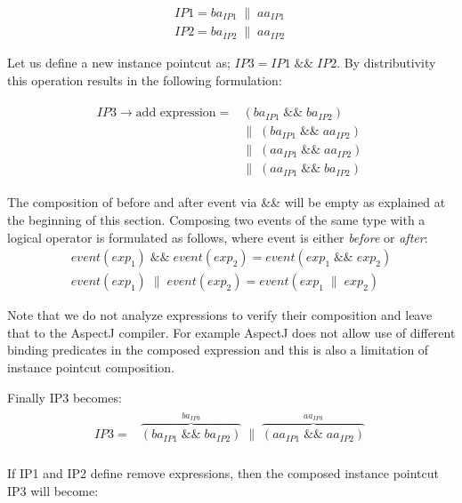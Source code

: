 \documentclass{llncs}
\begin{document}
\begin{align}
	IP1 = ba_{IP1}\;\|\;aa_{IP1}\;%
\label{i1}	\\
	IP2 = ba_{IP2}\;\|\;aa_{IP2}\;%
\label{i2}
\end{align}

Let us define a new instance pointcut as; $IP3 = IP1\;\textrm{\&\&}\;IP2$. By distributivity this operation results in the following formulation:

\begin{align}
\begin{split}
IP3 \rightarrow \textrm{add expression} =& \left( ba_{IP1}\;\textrm{\&\&}\;ba_{IP2}\right)\;\\ 
							&\|\;\left( ba_{IP1}\;\textrm{\&\&}\;aa_{IP2} \right)\;\\
&\|\;\left( aa_{IP1}\;\textrm{\&\&}\;aa_{IP2} \right)\;\\
&\|\;\left( aa_{IP1}\;\textrm{\&\&}\;ba_{IP2} \right) 
\label{i3add}
\end{split}
\end{align}

The composition of before and after event via \&\& will be empty as explained at the beginning of this section. Composing two events of the same type with a logical operator is formulated as follows, where event is either \emph{before} or \emph{after}:
\begin{align*}
event(exp_1)\;\&\&\;event(exp_2) = event(exp_1\;\&\&\;exp_2) \\
event(exp_1)\;\|\;event(exp_2) = event(exp_1\;\|\;exp_2)
\end{align*}

Note that we do not analyze expressions to verify their composition and leave that to the AspectJ compiler. For example AspectJ does not allow use of different binding predicates in the composed expression and this is also a limitation of instance pointcut composition. 

Finally IP3 becomes:
\begin{align}
\begin{split}
IP3 =& \overbrace{\left( ba_{IP1}\;\textrm{\&\&}\;ba_{IP2}\right)}^{ba_{IP3}}\;\|\;\overbrace{\left( aa_{IP1}\;\textrm{\&\&}\;aa_{IP2} \right)}^{aa_{IP3}}\;\\
\label{ip3step}
\end{split}
\end{align}

If IP1 and IP2 define remove expressions, then the composed instance pointcut IP3 will become:
\end{document}
